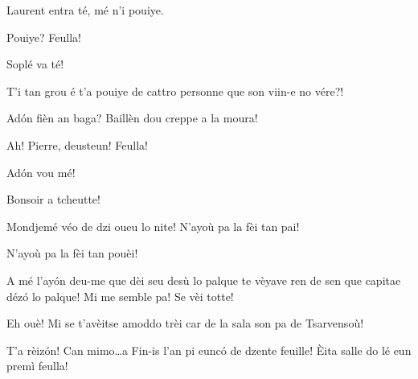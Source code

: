 

\DramPer

\markboth{\MakeUppercase{\thetitle}}{\MakeUppercase{\thetitle}}


\begin{drama}

\Pierrespeaks Laurent entra té, mé n'i pouiye.

\Laurentspeaks Pouiye? Feulla!

\Pierrespeaks {} Soplé va té!

\Laurentspeaks T'i tan grou é t'a pouiye de cattro personne que son viin-e no vére?!

\Pierrespeaks Ad\'on fièn an baga? Baillèn dou creppe a la moura!


\Laurentspeaks Ah! Pierre, deusteun! Feulla!

\Pierrespeaks{} Ad\'on vou mé!


\Pierrespeaks Bonsoir a tcheutte!


\Pierrespeaks{} Mondjemé véo de dzi oueu lo nite! N'ayoù pa la fèi tan pai!

\Laurentspeaks{} N'ayoù pa la fèi tan pouèi!

\Pierrespeaks A mé l'ay\'on deu-me que dèi seu desù lo palque te vèyave ren de sen que capitae déz\'o lo palque!  Mi me semble pa! Se vèi totte!

\Laurentspeaks Eh ouè! Mi se t'avèitse amoddo trèi car de la sala son pa de Tsarvensoù!

\Pierrespeaks T'a rèiz\'on! Can mimo\ldots a Fin-is l'an pi eunc\'o de dzente feuille! \`Eita salle do lé eun premì feulla!


\end{drama}
